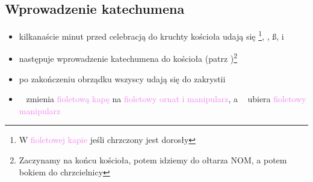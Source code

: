 \hrulefill

\subsection{Wprowadzenie katechumena}
\begin{itemize}
	\item kilkanaście minut przed celebracją do kruchty kościoła udają się \ii
	      \footnote{W \textcolor{violet}{fioletowej kapie} jeśli chrzczony jest
		      dorosły}, \dd, \ss,  i 
	\item następuje wprowadzenie katechumena do kościoła (patrz
	      )\footnote{Zaczynamy na końcu kościoła, potem
		      idziemy do ołtarza NOM, a potem bokiem do chrzcielnicy}
	\item po zakończeniu obrządku wszyscy udają się do zakrystii
	\item \ii~ zmienia \textcolor{violet}{fioletową kapę} na
	      \textcolor{violet}{fioletowy ornat i manipularz}, a \dd~ ubiera
	      \textcolor{violet}{fioletowy manipularz}
\end{itemize}

\hrulefill


